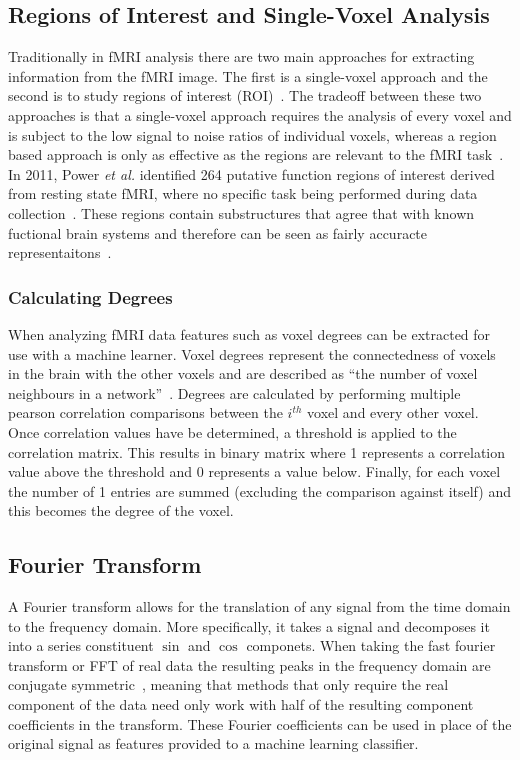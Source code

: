 \documentclass{article} %
\begin{document}
\subsection{Regions of Interest and Single-Voxel Analysis}
Traditionally in fMRI analysis there are two main approaches for extracting
information from the fMRI image. The first is a single-voxel approach and 
the second is to study regions of interest (ROI)~\cite{heller2006cluster}. 
The tradeoff between these two approaches is that a single-voxel approach
requires the analysis of every voxel and is subject to the low signal to 
noise ratios of individual voxels, whereas a region based approach is only
as effective as the regions are relevant to the fMRI 
task~\cite{heller2006cluster}. In 2011, Power \emph{et al.} identified 264 
putative function regions of interest derived from resting state fMRI, where 
no specific task being performed during data collection~\cite{Power_2011}. 
These regions contain substructures that agree that with known fuctional 
brain systems and therefore can be seen as fairly accuracte 
representaitons~\cite{Power_2011}.

\subsubsection{Calculating Degrees}
When analyzing fMRI data features such as voxel degrees can be extracted for
use with a machine learner. Voxel degrees represent the connectedness of
voxels in the brain with the other voxels and are described as ``the number
of voxel neighbours in a network''~\cite{Rish_2013}. Degrees are calculated 
by performing
multiple pearson correlation comparisons between the $i^{th}$ voxel and every
other voxel. Once correlation values have be determined, a threshold is
applied to the correlation matrix. This results in binary matrix where 1 
represents a correlation value above the threshold and 0 represents a value 
below. Finally, for each voxel the number of 1 entries are summed (excluding 
the comparison against itself) and this becomes the degree of the voxel.

\subsection{Fourier Transform}
A Fourier transform allows for the translation of any signal from the time
domain to the frequency domain. More specifically, it takes a signal and
decomposes it into a series constituent $\sin$ and $\cos$ componets. When 
taking the fast fourier transform or FFT of real data the resulting peaks in 
the frequency domain are conjugate symmetric~\cite{duhamel1990fast}, meaning 
that methods that only require the real component of the data need only work 
with half of the resulting component coefficients in the transform. These 
Fourier coefficients can be used in place of the original signal as features
provided to a machine learning classifier.
\end{document}
